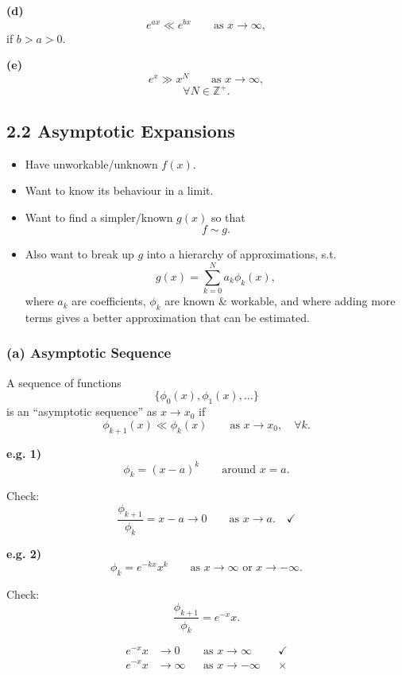 \documentclass[11pt,a4paper]{article}
\begin{document}
\noindent\textbf{(d)}
\[
e^{ax}\ll e^{bx}
\qquad \text{as }x\to\infty,
\]
if $b>a>0$.

\medskip

\noindent\textbf{(e)}
\[
e^x\gg x^N
\qquad \text{as }x\to\infty,
\]
\[
\forall N\in\mathbb{Z}^+.
\]


\subsection*{2.2 Asymptotic Expansions}

\begin{itemize}
    \item Have unworkable/unknown $f(x)$.

    \item Want to know its behaviour in a limit.

    \item Want to find a simpler/known $g(x)$ so that
    \[
    f\sim g.
    \]

    \item Also want to break up $g$ into a hierarchy of approximations, s.t.
    \[
    g(x)=\sum_{k=0}^{N}a_k\phi_k(x),
    \]
    where $a_k$ are coefficients, $\phi_k$ are known \& workable, and where adding more terms gives a better approximation that can be estimated.
\end{itemize}


\subsubsection*{(a) Asymptotic Sequence}

A sequence of functions
\[
\{\phi_0(x),\phi_1(x),\ldots\}
\]
is an ``asymptotic sequence'' as $x\to x_0$ if
\[
\boxed{
\phi_{k+1}(x)\ll\phi_k(x)
\qquad \text{as }x\to x_0,
\quad \forall k.
}
\]

\medskip

\noindent\textbf{e.g. 1)}
\[
\phi_k=(x-a)^k
\qquad \text{around }x=a.
\]

Check:
\[
\frac{\phi_{k+1}}{\phi_k}
=x-a\to0
\qquad \text{as }x\to a.
\quad \checkmark
\]

\medskip

\noindent\textbf{e.g. 2)}
\[
\phi_k=e^{-kx}x^k
\qquad \text{as }x\to\infty
\text{ or }x\to-\infty.
\]

Check:
\[
\frac{\phi_{k+1}}{\phi_k}
=e^{-x}x.
\]

\[
\begin{aligned}
e^{-x}x&\to0
&&\text{as }x\to\infty
&&\checkmark\\
e^{-x}x&\to\infty
&&\text{as }x\to-\infty
&&\times
\end{aligned}
\]
\end{document}
